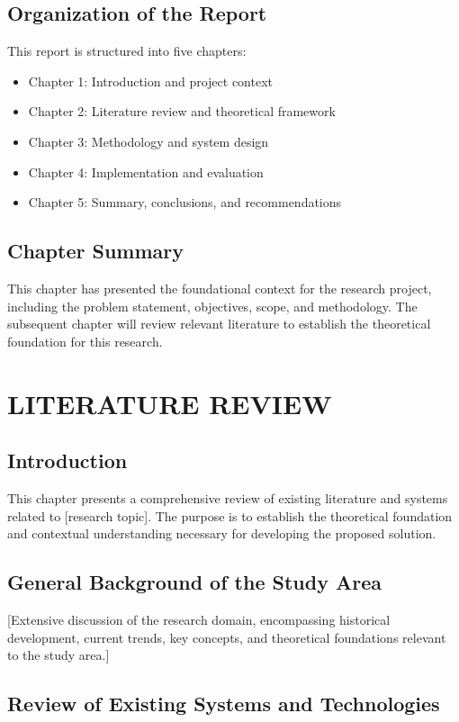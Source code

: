 \documentclass[12pt,twoside]{report}
\begin{document}
\section{Organization of the Report}
This report is structured into five chapters:
\begin{itemize}
    \item Chapter 1: Introduction and project context
    \item Chapter 2: Literature review and theoretical framework
    \item Chapter 3: Methodology and system design
    \item Chapter 4: Implementation and evaluation
    \item Chapter 5: Summary, conclusions, and recommendations
\end{itemize}

\section{Chapter Summary}
This chapter has presented the foundational context for the research project, including the problem statement, objectives, scope, and methodology. The subsequent chapter will review relevant literature to establish the theoretical foundation for this research.
\newpage

\chapter{LITERATURE REVIEW}
\section{Introduction}
This chapter presents a comprehensive review of existing literature and systems related to [research topic]. The purpose is to establish the theoretical foundation and contextual understanding necessary for developing the proposed solution.

\section{General Background of the Study Area}
[Extensive discussion of the research domain, encompassing historical development, current trends, key concepts, and theoretical foundations relevant to the study area.]

\section{Review of Existing Systems and Technologies}
\end{document}
